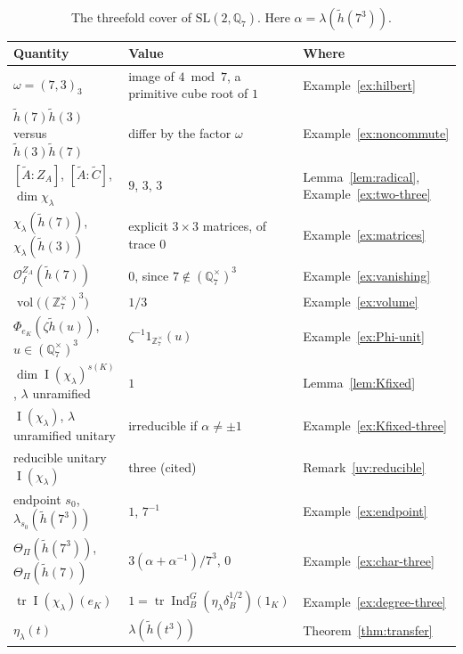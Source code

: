 \documentclass[12pt,letterpaper]{article}
\numberwithin{equation}{section}
\theoremstyle{plain}
\theoremstyle{definition}
\theoremstyle{remark}
\newcommand{\At}{\widetilde A}
\newcommand{\Ct}{\widetilde C}
\newcommand{\hl}{\tilde h}
\newcommand{\Zz}{\mathbb Z}
\newcommand{\Qq}{\mathbb Q}
\newcommand{\ZA}{Z_A}
\DeclareMathOperator{\PI}{I}
\DeclareMathOperator{\Ind}{Ind}
\DeclareMathOperator{\tr}{tr}
\DeclareMathOperator{\vol}{vol}
\newcommand{\SL}{\mathrm{SL}}
\begin{document}
\begin{table}[ht]
\centering
\small
\renewcommand{\arraystretch}{1.15}
\begin{tabular}{@{}lll@{}}
\toprule
Quantity & Value & Where\\
\midrule
$\omega=(7,3)_3$ & image of $4\bmod 7$, a primitive cube root of $1$ &
Example~\ref{ex:hilbert}\\
$\hl(7)\hl(3)$ versus $\hl(3)\hl(7)$ & differ by the factor $\omega$ &
Example~\ref{ex:noncommute}\\
$[\At:\ZA]$, $[\At:\Ct]$, $\dim\chi_\lambda$ & $9$, $3$, $3$ &
Lemma~\ref{lem:radical}, Example~\ref{ex:two-three}\\
$\chi_\lambda(\hl(7))$, $\chi_\lambda(\hl(3))$ & explicit $3\times3$
matrices, of trace $0$ & Example~\ref{ex:matrices}\\
$\mathcal O_f^{\ZA}(\hl(7))$ & $0$, since $7\notin(\Qq_7^\times)^3$ &
Example~\ref{ex:vanishing}\\
$\vol\bigl((\Zz_7^\times)^3\bigr)$ & $1/3$ & Example~\ref{ex:volume}\\
$\Phi_{e_K}(\zeta\hl(u))$, $u\in(\Qq_7^\times)^3$ &
$\zeta^{-1}1_{\Zz_7^\times}(u)$ & Example~\ref{ex:Phi-unit}\\
$\dim\PI(\chi_\lambda)^{s(K)}$, $\lambda$ unramified & $1$ &
Lemma~\ref{lem:Kfixed}\\
$\PI(\chi_\lambda)$, $\lambda$ unramified unitary & irreducible if
$\alpha\ne\pm1$ & Example~\ref{ex:Kfixed-three}\\
reducible unitary $\PI(\chi_\lambda)$ & three (cited) &
Remark~\ref{uv:reducible}\\
endpoint $s_0$, $\lambda_{s_0}(\hl(7^3))$ & $1$, $7^{-1}$ &
Example~\ref{ex:endpoint}\\
$\Theta_\Pi(\hl(7^3))$, $\Theta_\Pi(\hl(7))$ &
$3(\alpha+\alpha^{-1})/7^3$, $0$ & Example~\ref{ex:char-three}\\
$\tr\PI(\chi_\lambda)(e_K)$ & $1=\tr\Ind_B^G(\eta_\lambda\delta_B^{1/2})(1_K)$
& Example~\ref{ex:degree-three}\\
$\eta_\lambda(t)$ & $\lambda(\hl(t^3))$ & Theorem~\ref{thm:transfer}\\
\bottomrule
\end{tabular}
\caption{The threefold cover of $\SL(2,\Qq_7)$. Here
$\alpha=\lambda(\hl(7^3))$.}
\label{tab:running}
\end{table}
\end{document}
